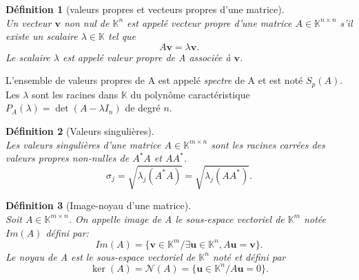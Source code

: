 \documentclass[11pt,a4paper,oneside]{book}
\newtheorem{defi}{Définition}[chapter]
\def\K{\mathbb K}
\def\v{\mathbf v}
\def\u{\mathbf u}
\begin{document}
\begin{defi}[valeurs propres et vecteurs propres d'une matrice]
	\emph{\\}
	Un vecteur $ \v $ non nul de $ \K^{n} $ est appelé vecteur propre d’une matrice $ A\in\K^{n\times n} $ s’il existe
	un scalaire $ \lambda\in\K $ tel que
	\begin{equation}
	A\v=\lambda\v.
	\end{equation}
	Le scalaire $ \lambda $ est appelé valeur propre de A associée à $ \v $.
\end{defi}
L'ensemble de valeurs propres de A est appelé \textit{spectre} de A et est noté $ S_{p}(A) $. Les $ \lambda $ sont les racines dans $ \K $ du polynôme caractéristique $ P_{A}(\lambda)=\det(A-\lambda I_{n}) $ de degré $ n $.
\begin{defi}[Valeurs singulières]\label{SVD}
	\emph{\\}
	Les valeurs singulières d’une matrice $ A\in \K^{m\times n} $ sont les racines carrées des valeurs propres
	non-nulles de $ A^{*}A $ et $ AA^{*} $.
	$$\sigma_{j}=\sqrt{\lambda_{j}(A^{*}A)}=\sqrt{\lambda_{j}(AA^{*})}. $$
\end{defi}
\begin{defi}[Image-noyau d'une matrice]
	\emph{\\} Soit $ A\in\K^{m\times n} $. On appelle image de A le sous-espace vectoriel de $ \K^{m} $ notée $ Im(A) $ défini par:
	\begin{equation}
	Im(A)=\{\v\in\K^{m}/\exists \u\in \K^{n}, A\u=\v\}.
	\end{equation}
	Le noyau  de A est le sous-espace vectoriel de $ \K^{n} $ noté et défini par
	\begin{equation}
	\ker(A)=\mathcal{N}(A)=\{\u\in\K^{n}/A\u=0\}.
	\end{equation}
\end{defi}
\end{document}
